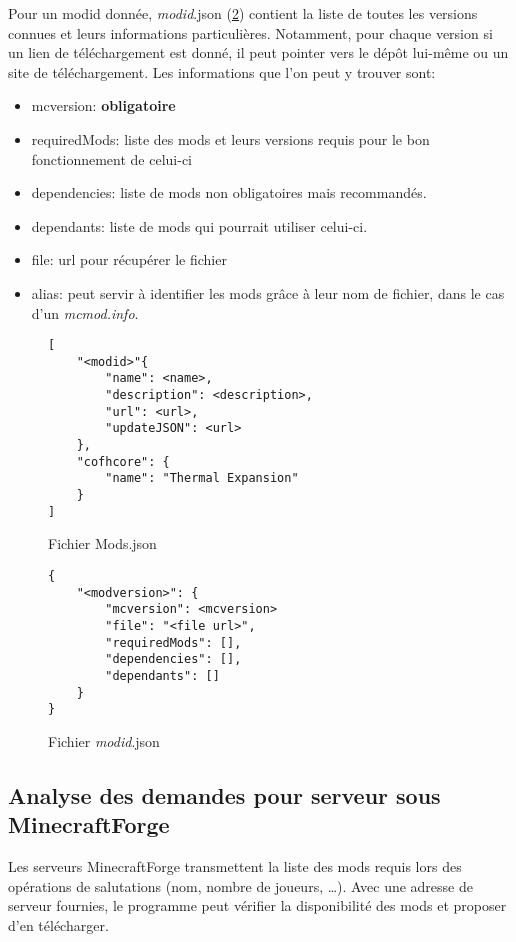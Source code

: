 \documentclass{article}
\begin{document}
Pour un modid donnée, \textit{modid}.json (\ref{figure:modid.json}) contient la liste de toutes les versions connues et leurs informations particulières.
Notamment, pour chaque version si un lien de téléchargement est donné, il peut pointer vers le dépôt lui-même ou un site de téléchargement.
Les informations que l'on peut y trouver sont:
\begin{itemize}
    \item mcversion: \textbf{obligatoire}
    \item requiredMods: liste des mods et leurs versions requis pour le bon fonctionnement de celui-ci
    \item dependencies: liste de mods non obligatoires mais recommandés.
    \item dependants: liste de mods qui pourrait utiliser celui-ci.
    \item file: url pour récupérer le fichier
    \item alias: peut servir à identifier les mods grâce à leur nom de fichier, dans le cas d'un \textit{mcmod.info}.
\end{itemize}

\begin{figure}
\centering
\begin{verbatim}
[
    "<modid>"{
        "name": <name>,
        "description": <description>,
        "url": <url>,
        "updateJSON": <url>
    },
    "cofhcore": {
        "name": "Thermal Expansion"
    }
]
\end{verbatim}
\caption{Fichier Mods.json}
\label{figure:mods.json}
\end{figure}

\begin{figure}
\begin{verbatim}
{
    "<modversion>": {
        "mcversion": <mcversion>
        "file": "<file url>",
        "requiredMods": [],
        "dependencies": [],
        "dependants": []
    }
}
\end{verbatim}
\caption{Fichier \textit{modid}.json}
\label{figure:modid.json}
\end{figure}


\subsection{Analyse des demandes pour serveur sous MinecraftForge}
Les serveurs MinecraftForge transmettent la liste des mods requis lors des opérations de salutations (nom, nombre de joueurs, \dots).
Avec une adresse de serveur fournies, le programme peut vérifier la disponibilité des mods et proposer d'en télécharger.
\end{document}
